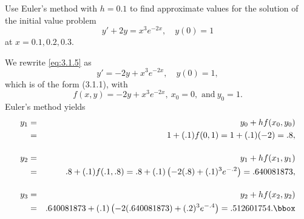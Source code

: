 \setcounter{example}{0}
\setcounter{equation}{4}
\begin{example}
  \label{example:3.1.1} \rm Use Euler's method with $h=0.1$ to find approximate values for the
  solution of the initial value problem
  \begin{equation}
    \label{eq:3.1.5}y'+2y=x^{3}e^{-2x},\quad y(0)=1
  \end{equation}
  at $x=0.1,0.2,0.3$.
\end{example}
\begin{examplesolution}
\solution We rewrite \eqref{eq:3.1.5} as
\[
  y'=-2y+x^{3}e^{-2x},\quad y(0)=1,
\]
which is of the form \textup{(3.1.1)}, with
\[
  f(x,y)=-2y+x^{3}e^{-2x},\ x_{0}=0,\mbox{\ and}\ y_{0}=1.
\]
Euler's method yields
\begin{eqnarray*}
  y_{1} & = & y_{0}+hf(x_{0},y_{0})                                                  \\
        & = & 1+(.1)f(0,1)=1+(.1)(-2)=.8,                                            \\[4\jot]
  y_{2} & = & y_{1}+hf(x_{1},y_{1})                                                  \\
        & = & .8+(.1)f(.1,.8)=.8+(.1)\left(-2(.8)+(.1)^{3}e^{-.2}\right)=.640081873, \\[4\jot]
  y_{3} & = & y_{2}+hf(x_{2},y_{2})                                                  \\
        & = & .640081873+(.1)\left(-2(.640081873)+(.2)^{3}e^{-.4}\right)=.512601754.\bbox
\end{eqnarray*}
\end{examplesolution}

